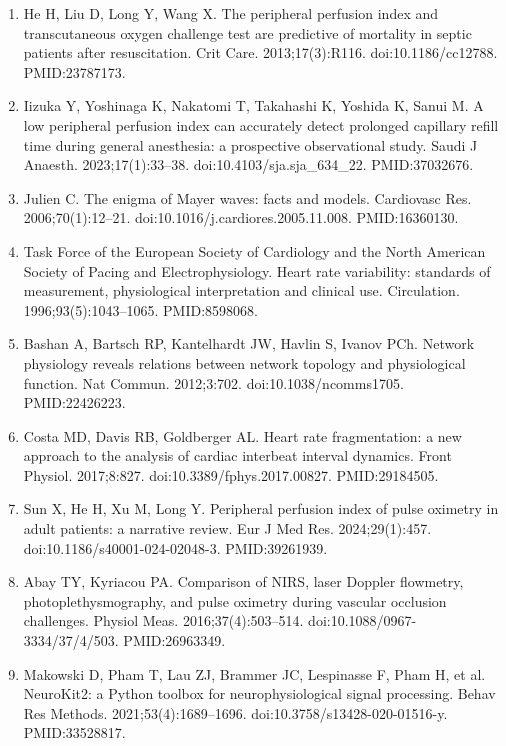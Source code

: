 \documentclass[twocolumn,letterpaper,10pt]{article}
\begin{document}
{\begin{enumerate}[leftmargin=2em,itemsep=2pt,label={\arabic*.}]
\item He H, Liu D, Long Y, Wang X. The peripheral perfusion index and transcutaneous oxygen challenge test are predictive of mortality in septic patients after resuscitation. Crit Care. 2013;17(3):R116. doi:10.1186/cc12788. PMID:23787173.

\item Iizuka Y, Yoshinaga K, Nakatomi T, Takahashi K, Yoshida K, Sanui M. A low peripheral perfusion index can accurately detect prolonged capillary refill time during general anesthesia: a prospective observational study. Saudi J Anaesth. 2023;17(1):33--38. doi:10.4103/sja.sja\_634\_22. PMID:37032676.

\item Julien C. The enigma of Mayer waves: facts and models. Cardiovasc Res. 2006;70(1):12--21. doi:10.1016/j.cardiores.2005.11.008. PMID:16360130.

\item Task Force of the European Society of Cardiology and the North American Society of Pacing and Electrophysiology. Heart rate variability: standards of measurement, physiological interpretation and clinical use. Circulation. 1996;93(5):1043--1065. PMID:8598068.

\item Bashan A, Bartsch RP, Kantelhardt JW, Havlin S, Ivanov PCh. Network physiology reveals relations between network topology and physiological function. Nat Commun. 2012;3:702. doi:10.1038/ncomms1705. PMID:22426223.

\item Costa MD, Davis RB, Goldberger AL. Heart rate fragmentation: a new approach to the analysis of cardiac interbeat interval dynamics. Front Physiol. 2017;8:827. doi:10.3389/fphys.2017.00827. PMID:29184505.

\item Sun X, He H, Xu M, Long Y. Peripheral perfusion index of pulse oximetry in adult patients: a narrative review. Eur J Med Res. 2024;29(1):457. doi:10.1186/s40001-024-02048-3. PMID:39261939.

\item Abay TY, Kyriacou PA. Comparison of NIRS, laser Doppler flowmetry, photoplethysmography, and pulse oximetry during vascular occlusion challenges. Physiol Meas. 2016;37(4):503--514. doi:10.1088/0967-3334/37/4/503. PMID:26963349.

\item Makowski D, Pham T, Lau ZJ, Brammer JC, Lespinasse F, Pham H, et al. NeuroKit2: a Python toolbox for neurophysiological signal processing. Behav Res Methods. 2021;53(4):1689--1696. doi:10.3758/s13428-020-01516-y. PMID:33528817.


\end{enumerate}}
\end{document}
